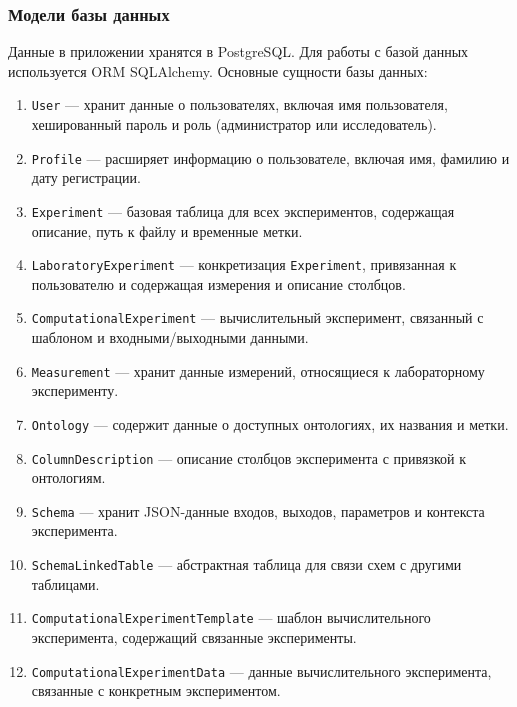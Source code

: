 


\subsubsection{Модели базы данных}\label{ORM models}

Данные в приложении хранятся в PostgreSQL. Для работы с базой данных используется ORM SQLAlchemy. Основные сущности базы данных:

\begin{enumerate}
    \item \texttt{User} — хранит данные о пользователях, включая имя пользователя, хешированный пароль и роль (администратор или исследователь).
    \item \texttt{Profile} — расширяет информацию о пользователе, включая имя, фамилию и дату регистрации.
    \item \texttt{Experiment} — базовая таблица для всех экспериментов, содержащая описание, путь к файлу и временные метки.
    \item \texttt{LaboratoryExperiment} — конкретизация \texttt{Experiment}, привязанная к пользователю и содержащая измерения и описание столбцов.
    \item \texttt{ComputationalExperiment} — вычислительный эксперимент, связанный с шаблоном и входными/выходными данными.
    \item \texttt{Measurement} — хранит данные измерений, относящиеся к лабораторному эксперименту.
    \item \texttt{Ontology} — содержит данные о доступных онтологиях, их названия и метки.
    \item \texttt{ColumnDescription} — описание столбцов эксперимента с привязкой к онтологиям.
    \item \texttt{Schema} — хранит JSON-данные входов, выходов, параметров и контекста эксперимента.
    \item \texttt{SchemaLinkedTable} — абстрактная таблица для связи схем с другими таблицами.
    \item \texttt{ComputationalExperimentTemplate} — шаблон вычислительного эксперимента, содержащий связанные эксперименты.
    \item \texttt{ComputationalExperimentData} — данные вычислительного эксперимента, связанные с конкретным экспериментом.
\end{enumerate}

